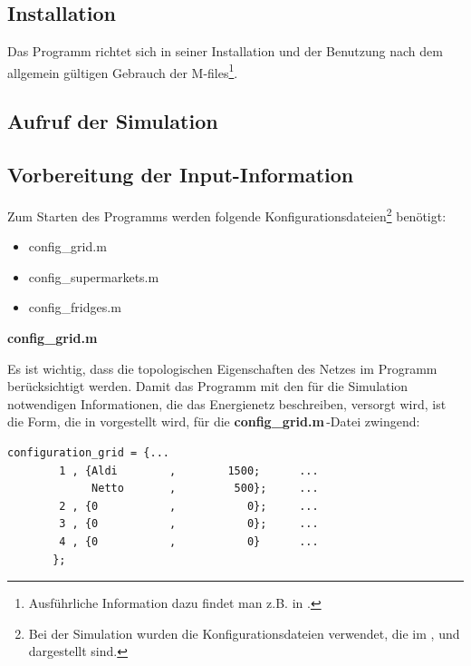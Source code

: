 \subsection{Installation}

Das Programm richtet sich in seiner Installation und der Benutzung nach dem
allgemein gültigen Gebrauch der \matlab M-files\footnote{
Ausführliche Information dazu findet man z.B. in \cite{MATLAB-Buch}.}.

\subsection{Aufruf der Simulation}%
\subsection*{Vorbereitung der Input-Information}
\label{sec:input_infos}

Zum Starten des Programms werden folgende Konfigurationsdateien\footnote{ Bei
der Simulation wurden die Konfigurationsdateien verwendet, die im
,  und 
dargestellt sind.} benötigt:

\begin{itemize}
	\item config\_grid.m
	\item config\_supermarkets.m
	\item config\_fridges.m
\end{itemize}
\vspace{3mm}
\noindent\textbf{config\_grid.m}
\vspace{3mm}

Es ist wichtig, dass die topologischen Eigenschaften des Netzes im Programm
berücksichtigt werden. Damit das Programm mit den für die Simulation notwendigen
Informationen, die das Energienetz beschreiben, versorgt wird, ist die Form, die
in  vorgestellt wird, für die \textbf{config\_grid.m$\,$}-Datei
zwingend:

\begin{lstlisting}[float=h,caption={config\_grid.m},label={cgrid}]
%%	Bus,  Supermarkets,	  Number of Supermarkets
configuration_grid = {...
        1 , {Aldi	     ,	      1500;	     ...
             Netto	     ,	       500};	 ...
        2 , {0	         ,           0};	 ...
        3 , {0	         ,           0};	 ...
        4 , {0	         ,           0}	     ...
       };
\end{lstlisting}


